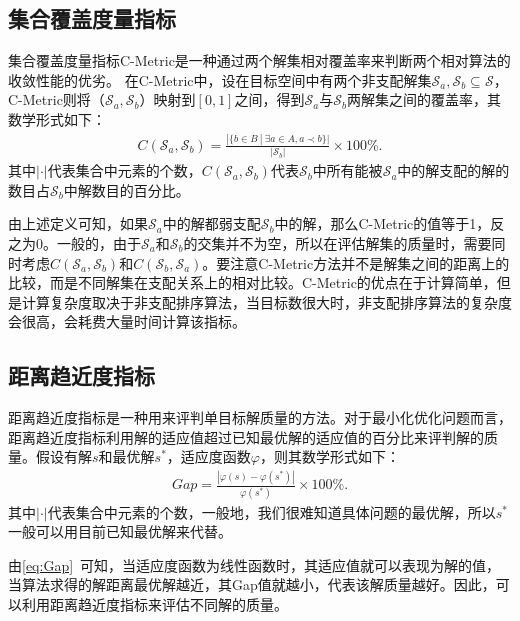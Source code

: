 \subsection{集合覆盖度量指标}
\label{subsec:背景介绍:性能评价指标:集合覆盖度量指标}
集合覆盖度量指标C-Metric是一种通过两个解集相对覆盖率来判断两个相对算法的收敛性能的优劣。
在C-Metric中，设在目标空间中有两个非支配解集$\mathcal{S}_a, \mathcal{S}_b \subseteq \mathcal{S}$，C-Metric则将（$\mathcal{S}_a, \mathcal{S}_b$）映射到$[0, 1]$之间，得到$\mathcal{S}_a$与$\mathcal{S}_b$两解集之间的覆盖率，其数学形式如下：
\begin{align}
    \label{eq:C-Metric}
    C(\mathcal{S}_a, \mathcal{S}_b) = \frac{|\{ b \in B \ | \ \exists a \in A, a \prec b \}|}{|\mathcal{S}_b|} \times 100\%.
\end{align}
其中$| \cdot  \vert $代表集合中元素的个数，$C(\mathcal{S}_a, \mathcal{S}_b)$代表$\mathcal{S}_b$中所有能被$\mathcal{S}_a$中的解支配的解的数目占$\mathcal{S}_b$中解数目的百分比。
\par
由上述定义可知，如果$\mathcal{S}_a$中的解都弱支配$\mathcal{S}_b$中的解，那么C-Metric的值等于1，反之为0。一般的，由于$\mathcal{S}_a$和$\mathcal{S}_b$的交集并不为空，所以在评估解集的质量时，需要同时考虑$C(\mathcal{S}_a, \mathcal{S}_b)$和$C(\mathcal{S}_b, \mathcal{S}_a)$。要注意C-Metric方法并不是解集之间的距离上的比较，而是不同解集在支配关系上的相对比较。C-Metric的优点在于计算简单，但是计算复杂度取决于非支配排序算法，当目标数很大时，非支配排序算法的复杂度会很高，会耗费大量时间计算该指标。

\subsection{距离趋近度指标}
\label{subsec:背景介绍:性能评价指标:距离趋近度指标}
距离趋近度指标是一种用来评判单目标解质量的方法。对于最小化优化问题而言，距离趋近度指标利用解的适应值超过已知最优解的适应值的百分比来评判解的质量。假设有解$s$和最优解$s^*$，适应度函数$\varphi$，则其数学形式如下：
\begin{align}
    \label{eq:Gap}
    Gap = \frac{|\varphi (s) - \varphi (s^*)|}{\varphi (s^*)} \times 100\%.
\end{align}
其中$| \cdot  \vert $代表集合中元素的个数，一般地，我们很难知道具体问题的最优解，所以$s^*$一般可以用目前已知最优解来代替。
\par
由\autoref{eq:Gap}~可知，当适应度函数为线性函数时，其适应值就可以表现为解的值，当算法求得的解距离最优解越近，其Gap值就越小，代表该解质量越好。因此，可以利用距离趋近度指标来评估不同解的质量。


